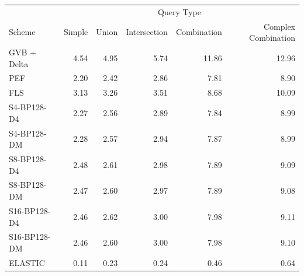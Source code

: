 \begin{tabular}{lrrrrr}
\toprule
 & \multicolumn{5}{c}{Query Type} \\
Scheme & Simple & Union & Intersection & Combination & Complex Combination \\
\midrule
GVB + Delta & 4.54 & 4.95 & 5.74 & 11.86 & 12.96 \\
PEF & 2.20 & 2.42 & 2.86 & 7.81 & 8.90 \\
FLS & 3.13 & 3.26 & 3.51 & 8.68 & 10.09 \\
S4-BP128-D4 & 2.27 & 2.56 & 2.89 & 7.84 & 8.99 \\
S4-BP128-DM & 2.28 & 2.57 & 2.94 & 7.87 & 8.99 \\
S8-BP128-D4 & 2.48 & 2.61 & 2.98 & 7.89 & 9.09 \\
S8-BP128-DM & 2.47 & 2.60 & 2.97 & 7.89 & 9.08 \\
S16-BP128-D4 & 2.46 & 2.62 & 3.00 & 7.98 & 9.11 \\
S16-BP128-DM & 2.46 & 2.60 & 3.00 & 7.98 & 9.10 \\
ELASTIC & 0.11 & 0.23 & 0.24 & 0.46 & 0.64 \\
\bottomrule
\end{tabular}
